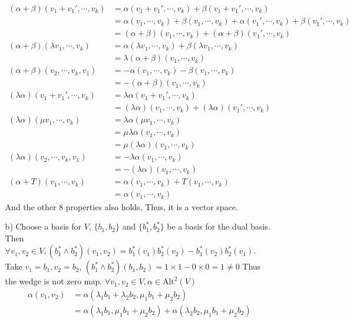 \documentclass{article}
\begin{document}
\begin{itemize}
\begin{itemize}
\begin{align*}
            (\alpha+\beta)(v_1+v_1',\cdots,v_k)&=\alpha(v_1+v_1',\cdots,v_k)+\beta(v_1+v_1',\cdots,v_k)\\
            &=\alpha(v_1,\cdots,v_k)+\beta(v_1,\cdots,v_k)+\alpha(v_1',\cdots,v_k)+\beta(v_1',\cdots,v_k)\\
            &=(\alpha+\beta)(v_1,\cdots,v_k)+(\alpha+\beta)(v_1',\cdots,v_k)\\
            (\alpha+\beta)(\lambda v_1,\cdots,v_k)&=\alpha(\lambda v_1,\cdots,v_k)+\beta(\lambda v_1,\cdots,v_k)\\
            &=\lambda (\alpha+\beta)(v_1,\cdots,v_k)\\
            (\alpha+\beta)(v_2,\cdots,v_k,v_1)&=-\alpha(v_1,\cdots,v_k)-\beta(v_1,\cdots,v_k)\\
            &=-(\alpha+\beta)(v_1,\cdots,v_k)\\
            (\lambda \alpha)(v_1+v_1',\cdots,v_k)&=\lambda \alpha(v_1+v_1',\cdots,v_k)\\
            &=(\lambda \alpha)(v_1,\cdots,v_k)+(\lambda \alpha)(v_1',\cdots,v_k)\\
            (\lambda \alpha)(\mu v_1,\cdots,v_k)&=\lambda \alpha(\mu v_1,\cdots,v_k)\\
            &=\mu \lambda \alpha(v_1,\cdots,v_k) \\
            &=\mu (\lambda \alpha)(v_1,\cdots,v_k)\\
            (\lambda \alpha)(v_2,\cdots,v_k,v_1)&=-\lambda \alpha(v_1,\cdots,v_k)\\
            &=-(\lambda \alpha)(v_1,\cdots,v_k)\\
            (\alpha +T)(v_1,\cdots,v_k)&=\alpha(v_1,\cdots,v_k)+T(v_1,\cdots,v_k)\\
            &=\alpha(v_1,\cdots,v_k)
        \end{align*}
        And the other 8 properties also holds, Thus, it is a vector space.
        \item [b)]Choose a basis for \(V\), \(\{b_1,b_2\}\) and \(\{b_1^*,b_2^*\}\) be a basis for the dual basis. Then
        \(\forall v_1,v_2\in V, (b^*_1\wedge b^*_2)(v_1,v_2)=b_1^*(v_1)b_2^*(v_2)-b_1^*(v_2)b_2^*(v_1)\). Take \(v_1=b_1,v_2=b_2\), \((b^*_1\wedge b^*_2)(b_1,b_2)=1\times 1 - 0\times 0 =1\neq 0\) Thus the wedge is not zero map.
        \(\forall v_1,v_2\in V,\alpha \in \text{Alt}^2(V)\)
        \begin{align*}
            \alpha(v_1,v_2)&=\alpha(\lambda_1b_1+\lambda_2b_2,\mu_1b_1+\mu_2b_2)\\
            &=\alpha(\lambda_1b_1,\mu_1b_1+\mu_2b_2)+\alpha(\lambda_2b_2,\mu_1b_1+\mu_2b_2)\\

\end{align*}
\end{itemize}
\end{itemize}
\end{document}
